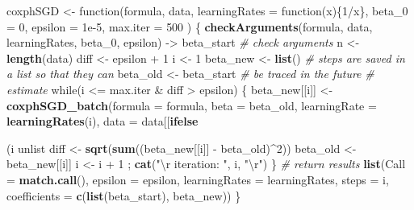 \documentclass[]{article}
\newenvironment{Shaded}{\begin{snugshade}}{\end{snugshade}}
\newcommand{\KeywordTok}[1]{\textcolor[rgb]{0.13,0.29,0.53}{\textbf{{#1}}}}
\newcommand{\DataTypeTok}[1]{\textcolor[rgb]{0.13,0.29,0.53}{{#1}}}
\newcommand{\DecValTok}[1]{\textcolor[rgb]{0.00,0.00,0.81}{{#1}}}
\newcommand{\FloatTok}[1]{\textcolor[rgb]{0.00,0.00,0.81}{{#1}}}
\newcommand{\CharTok}[1]{\textcolor[rgb]{0.31,0.60,0.02}{{#1}}}
\newcommand{\StringTok}[1]{\textcolor[rgb]{0.31,0.60,0.02}{{#1}}}
\newcommand{\CommentTok}[1]{\textcolor[rgb]{0.56,0.35,0.01}{\textit{{#1}}}}
\newcommand{\NormalTok}[1]{{#1}}
\begin{document}
\begin{Shaded}
\begin{Highlighting}[]
\NormalTok{coxphSGD <-}\StringTok{ }\NormalTok{function(formula, data, }\DataTypeTok{learningRates =} \NormalTok{function(x)\{}\DecValTok{1}\NormalTok{/x\},}
                    \DataTypeTok{beta_0 =} \DecValTok{0}\NormalTok{, }\DataTypeTok{epsilon =} \FloatTok{1e-5}\NormalTok{, }\DataTypeTok{max.iter =} \DecValTok{500} \NormalTok{) \{}
  \KeywordTok{checkArguments}\NormalTok{(formula, data, learningRates,}
                  \NormalTok{beta_0, epsilon) ->}\StringTok{ }\NormalTok{beta_start }\CommentTok{# check arguments}
  \NormalTok{n <-}\StringTok{ }\KeywordTok{length}\NormalTok{(data)}
  \NormalTok{diff <-}\StringTok{ }\NormalTok{epsilon +}\StringTok{ }\DecValTok{1}
  \NormalTok{i <-}\StringTok{ }\DecValTok{1}
  \NormalTok{beta_new <-}\StringTok{ }\KeywordTok{list}\NormalTok{()     }\CommentTok{# steps are saved in a list so that they can}
  \NormalTok{beta_old <-}\StringTok{ }\NormalTok{beta_start }\CommentTok{# be traced in the future}
  \CommentTok{# estimate}
  \NormalTok{while(i <=}\StringTok{ }\NormalTok{max.iter &}\StringTok{ }\NormalTok{diff >}\StringTok{ }\NormalTok{epsilon) \{}
    \NormalTok{beta_new[[i]] <-}\StringTok{ }\KeywordTok{coxphSGD_batch}\NormalTok{(}\DataTypeTok{formula =} \NormalTok{formula, }\DataTypeTok{beta =} \NormalTok{beta_old,}
        \DataTypeTok{learningRate =} \KeywordTok{learningRates}\NormalTok{(i), }\DataTypeTok{data =} \NormalTok{data[[}\KeywordTok{ifelse}\NormalTok{(i%%n==}\DecValTok{0}\NormalTok{,n,i%%n)]]) %>%}
\StringTok{      }\NormalTok{unlist}
    \NormalTok{diff <-}\StringTok{ }\KeywordTok{sqrt}\NormalTok{(}\KeywordTok{sum}\NormalTok{((beta_new[[i]] -}\StringTok{ }\NormalTok{beta_old)^}\DecValTok{2}\NormalTok{))}
    \NormalTok{beta_old <-}\StringTok{ }\NormalTok{beta_new[[i]]}
    \NormalTok{i <-}\StringTok{ }\NormalTok{i +}\StringTok{ }\DecValTok{1}  \NormalTok{; }\KeywordTok{cat}\NormalTok{(}\StringTok{"}\CharTok{\textbackslash{}r}\StringTok{ iteration: "}\NormalTok{, i, }\StringTok{"}\CharTok{\textbackslash{}r}\StringTok{"}\NormalTok{)}
  \NormalTok{\}  }\CommentTok{# return results}
  \KeywordTok{list}\NormalTok{(}\DataTypeTok{Call =} \KeywordTok{match.call}\NormalTok{(), }\DataTypeTok{epsilon =} \NormalTok{epsilon, }\DataTypeTok{learningRates =} \NormalTok{learningRates,}
       \DataTypeTok{steps =} \NormalTok{i, }\DataTypeTok{coefficients =} \KeywordTok{c}\NormalTok{(}\KeywordTok{list}\NormalTok{(beta_start), beta_new))}
\NormalTok{\}}

}
\end{Highlighting}
\end{Shaded}
\end{document}
